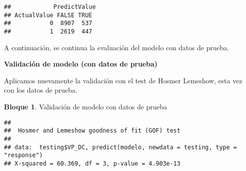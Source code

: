 \documentclass[
]{book}
\newenvironment{Shaded}{\begin{snugshade}}{\end{snugshade}}
\newcommand{\AttributeTok}[1]{\textcolor[rgb]{0.77,0.63,0.00}{#1}}
\newcommand{\CommentTok}[1]{\textcolor[rgb]{0.56,0.35,0.01}{\textit{#1}}}
\newcommand{\DecValTok}[1]{\textcolor[rgb]{0.00,0.00,0.81}{#1}}
\newcommand{\FunctionTok}[1]{\textcolor[rgb]{0.00,0.00,0.00}{#1}}
\newcommand{\NormalTok}[1]{#1}
\newcommand{\OtherTok}[1]{\textcolor[rgb]{0.56,0.35,0.01}{#1}}
\newcommand{\SpecialCharTok}[1]{\textcolor[rgb]{0.00,0.00,0.00}{#1}}
\newcommand{\StringTok}[1]{\textcolor[rgb]{0.31,0.60,0.02}{#1}}
\theoremstyle{definition}
\theoremstyle{definition}
\newtheorem{example}{Bloque}[chapter]
\theoremstyle{definition}
\theoremstyle{definition}
\theoremstyle{remark}
\begin{document}
\begin{Shaded}
\end{Shaded}

\begin{verbatim}
##            PredictValue
## ActualValue FALSE TRUE
##           0  8907  537
##           1  2619  447
\end{verbatim}

A continuación, se continua la evaluación del modelo con datos de prueba.

\textbf{Validación de modelo (con datos de prueba)}

Aplicamos nuevamente la validación con el test de Hosmer Lemeshow, esta vez con los datos de prueba.

\begin{example}
\protect\hypertarget{exm:bloque21nbm}{}\label{exm:bloque21nbm}Validación de modelo con datos de prueba
\end{example}

\begin{Shaded}
\end{Shaded}

\begin{verbatim}
## 
##  Hosmer and Lemeshow goodness of fit (GOF) test
## 
## data:  testing$VP_DC, predict(modelo, newdata = testing, type = "response")
## X-squared = 60.369, df = 3, p-value = 4.903e-13
\end{verbatim}

\begin{Shaded}
\end{Shaded}
\end{document}
